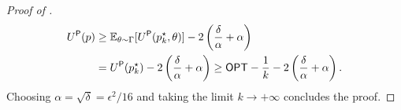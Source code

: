 \begin{proof}[Proof of ]
\begin{align*}
	U^\textsf{P}(p)&
    \ge \mathbb{E}_{\theta\sim\Gamma}[U^\textsf{P}(p^\star_k,\theta)]-2\left(\frac\delta\alpha+\alpha\right) \\
    &=U^\textsf{P}(p^\star_k)-2\left(\frac\delta\alpha+\alpha\right)\ge \textsf{OPT}-\frac{1}{k}-2\left(\frac\delta\alpha+\alpha\right).
	\end{align*}
    Choosing $\alpha=\sqrt{\delta}=\epsilon^2/16$ and taking the limit $k\to+\infty$ concludes the proof.	
\end{proof}


